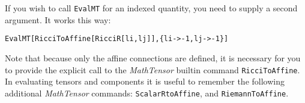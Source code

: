 If you wish to call {\tt EvalMT} for an indexed quantity, you need
to supply a second argument.  It works this way:
\begin{verbatim}
EvalMT[RicciToAffine[RicciR[li,lj]],{li->-1,lj->-1}]
\end{verbatim}
Note that because only the affine connections are defined, it is
necessary for you to provide the explicit call to the {\it MathTensor}
builtin command {\tt RicciToAffine}.  In evaluating tensors and
components it is useful to remember the following additional
{\it MathTensor} commands: {\tt ScalarRtoAffine}, and {\tt RiemannToAffine}.



